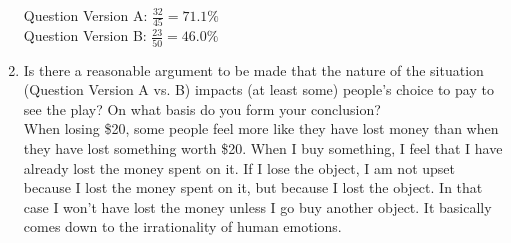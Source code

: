 \documentclass{scrartcl}
\begin{document}
\begin{enumerate}
  Question Version A: $\frac{32}{45} = 71.1\%$\\
  Question Version B: $\frac{23}{50} = 46.0\%$\\

\item Is there a reasonable argument to be made that the nature of the situation (Question Version A vs. B) impacts (at least some) people’s choice to pay to see the play? On what basis do you form your conclusion?\\

  When losing \$20, some people feel more like they have lost money than when they have lost something worth \$20. When I buy something, I feel that I have already lost
the money spent on it. If I lose the object, I am not upset because I lost the money spent on it, but because I lost the object. In that case I won't have lost the money
unless I go buy another object. It basically comes down to the irrationality of human emotions.

\end{enumerate}
\end{document}
